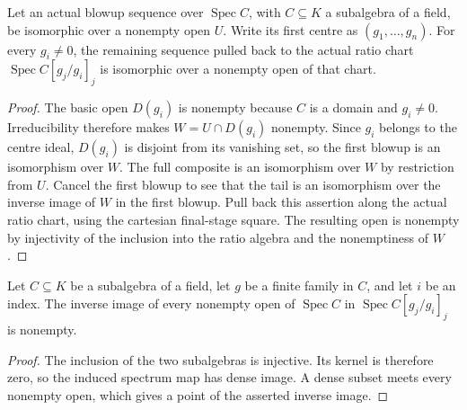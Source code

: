 \begin{lemma}\label{lem:sc0-rees-tail-open-iso}
\leanok
{}
Let an actual blowup sequence over $\operatorname{Spec}C$, with $C\subseteq K$ a
subalgebra of a field, be isomorphic over a nonempty open $U$. Write its first
centre as $(g_1,\ldots,g_n)$. For every $g_i\ne0$, the remaining sequence pulled
back to the actual ratio chart $\operatorname{Spec}C[g_j/g_i]_j$ is isomorphic over
a nonempty open of that chart.
\end{lemma}
\begin{proof}
The basic open $D(g_i)$ is nonempty because $C$ is a domain and $g_i\ne0$.
Irreducibility therefore makes $W=U\cap D(g_i)$ nonempty. Since $g_i$ belongs to
the centre ideal, $D(g_i)$ is disjoint from its vanishing set, so the first blowup
is an isomorphism over $W$. The full composite is an isomorphism over $W$ by
restriction from $U$. Cancel the first blowup to see that the tail is an
isomorphism over the inverse image of $W$ in the first blowup. Pull back this
assertion along the actual ratio chart, using the cartesian final-stage square.
The resulting open is nonempty by injectivity of the inclusion into the ratio
algebra and the nonemptiness of $W$.
\end{proof}

\begin{lemma}\label{lem:sc0-rees-open-nonempty}
\leanok
{}
Let $C\subseteq K$ be a subalgebra of a field, let $g$ be a finite family in $C$,
and let $i$ be an index. The inverse image of every nonempty open of
$\operatorname{Spec}C$ in $\operatorname{Spec}C[g_j/g_i]_j$ is nonempty.
\end{lemma}
\begin{proof}
The inclusion of the two subalgebras is injective. Its kernel is therefore zero,
so the induced spectrum map has dense image. A dense subset meets every nonempty
open, which gives a point of the asserted inverse image.
\end{proof}

